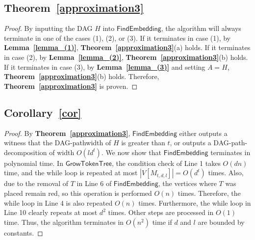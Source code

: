 \documentclass[runningheads]{llncs}
\theoremstyle{plain}
\theoremstyle{definition}
\begin{document}
\subsection{\textbf{Theorem~\ref{approximation3}}}\label{appendix_D8}
\begin{proof}
    By inputting the DAG $H$ into $\mathsf{FindEmbedding}$, the algorithm will always terminate in one of the cases (1), (2), or (3). If it terminates in case (1), by \textbf{Lemma~\ref{lemma_(1)}}, \textbf{Theorem~\ref{approximation3}}(a) holds. If it terminates in case (2), by \textbf{Lemma~\ref{lemma_(2)}}, \textbf{Theorem~\ref{approximation3}}(b) holds. If it terminates in case (3), by \textbf{Lemma~\ref{lemma_(3)}} and setting $A = H$, \textbf{Theorem~\ref{approximation3}}(b) holds. Therefore, \textbf{Theorem~\ref{approximation3}} is proven.
\end{proof}


\subsection{\textbf{Corollary~\ref{cor}}}\label{appendix_D9}
\begin{proof}
    By \textbf{Theorem~\ref{approximation3}}, $\mathsf{FindEmbedding}$ either outputs a witness that the DAG-pathwidth of $H$ is greater than $t$, or outputs a DAG-path-decomposition of width $O(ld^t)$. We now show that $\mathsf{FindEmbedding}$ terminates in polynomial time. In $\mathsf{GrowTokenTree}$, the condition check of Line 1 takes $O(dn)$ time, and the while loop is repeated at most $|V[M_{t, d, l}]| = O(d^t)$ times. Also, due to the removal of $T$ in Line 6 of $\mathsf{FindEmbedding}$, the vertices where $T$ was placed remain red, so this operation is performed $O(n)$ times. Therefore, the while loop in Line 4 is also repeated $O(n)$ times. Furthermore, the while loop in Line 10 clearly repeats at most $d^2$ times. Other steps are processed in $O(1)$ time. Thus, the algorithm terminates in $O(n^2)$ time if $d$ and $l$ are bounded by constants.
\end{proof}
\end{document}
